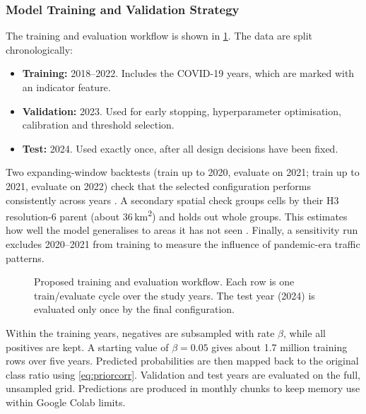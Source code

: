 \subsubsection{Model Training and Validation Strategy}
\label{sec:validation}

The training and evaluation workflow is shown in \cref{fig:training}. The data are split chronologically:
\begin{itemize}
\item \textbf{Training:} 2018--2022. Includes the COVID-19 years, which are marked with an indicator feature.
\item \textbf{Validation:} 2023. Used for early stopping, hyperparameter optimisation, calibration and threshold selection.
\item \textbf{Test:} 2024. Used exactly once, after all design decisions have been fixed.
\end{itemize}
Two expanding-window backtests (train up to 2020, evaluate on 2021; train up to 2021, evaluate on 2022) check that the selected configuration performs consistently across years \cite{cerqueira2020evaluating}. A secondary spatial check groups cells by their H3 resolution-6 parent (about 36\,km\textsuperscript{2}) and holds out whole groups. This estimates how well the model generalises to areas it has not seen \cite{roberts2017cross}. Finally, a sensitivity run excludes 2020--2021 from training to measure the influence of pandemic-era traffic patterns.

\begin{figure}[t]
\centering

\caption{Proposed training and evaluation workflow. Each row is one train/evaluate cycle over the study years. The test year (2024) is evaluated only once by the final configuration.}
\label{fig:training}
\end{figure}

Within the training years, negatives are subsampled with rate $\beta$, while all positives are kept. A starting value of $\beta=0.05$ gives about 1.7 million training rows over five years. Predicted probabilities are then mapped back to the original class ratio using \cref{eq:priorcorr}. Validation and test years are evaluated on the full, unsampled grid. Predictions are produced in monthly chunks to keep memory use within Google Colab limits.

